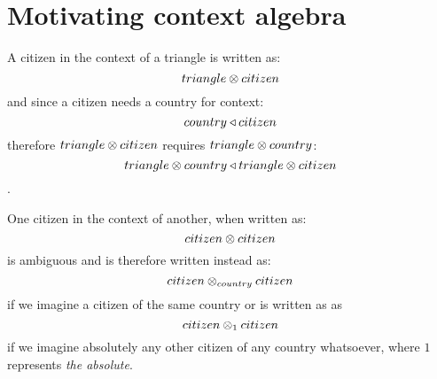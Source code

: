\documentclass[10pt,a4paper]{scrartcl}
\begin{document}
\section{Motivating context algebra}
A citizen in the context of a triangle is written as:
$$
triangle \otimes citizen
$$
and since a citizen needs a country for context:
$$
country \triangleleft citizen
$$
 therefore $triangle \otimes citizen$ requires $triangle \otimes country$:
$$ triangle \otimes country \triangleleft triangle \otimes citizen$$.



One citizen in the context of another, when written as:
$$citizen \otimes citizen$$
is ambiguous and is therefore written instead as:
$$citizen \otimes_{country} citizen$$
if we imagine a citizen of the same country or is written as as
$$citizen \otimes_1 citizen$$
if we imagine absolutely any other citizen of any country whatsoever, 
where $1$ represents \textit{the absolute}. 



 
\end{document}
